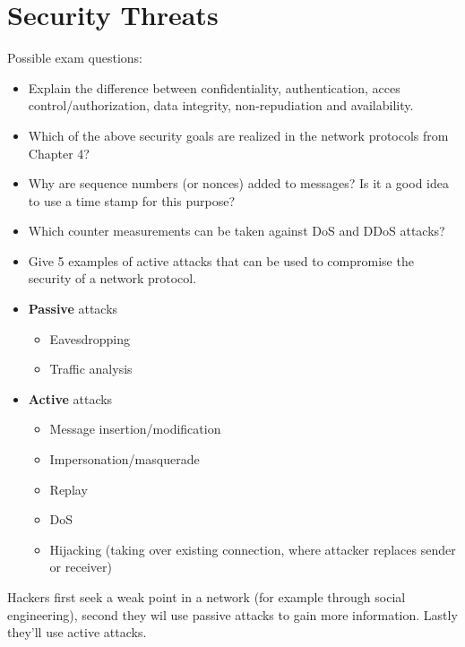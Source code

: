 \documentclass[11pt,british,faculty=ea,layout=titlefont,underline=false,titleUppercase=true,titleUnderline=true,hidelinks]{ugent2016-report}
\begin{document}
	\section{Security Threats} \label{sec:security-threats}
		Possible exam questions:
		\begin{itemize} \bfseries
			\item Explain the difference between confidentiality, authentication, acces control/authorization, data integrity, non-repudiation and availability.
			\item Which of the above security goals are realized in the network protocols from Chapter 4?
			\item Why are sequence numbers (or nonces) added to messages? Is it a good idea to use a time stamp for this purpose?
			\item Which counter measurements can be taken against DoS and DDoS attacks?
			\item Give 5 examples of active attacks that can be used to compromise the security of a network protocol.
		\end{itemize}
		\begin{itemize}
			\item \textbf{Passive} attacks
				\begin{itemize}
					\item Eavesdropping
					\item Traffic analysis
				\end{itemize}
			\item \textbf{Active} attacks
				\begin{itemize}
					\item Message insertion/modification
					\item Impersonation/masquerade
					\item Replay
					\item DoS
					\item Hijacking (taking over existing connection, where attacker replaces sender or receiver)
				\end{itemize}
		\end{itemize}
		Hackers first seek a weak point in a network (for example through social engineering), second they wil use passive attacks to gain more information. Lastly they'll use active attacks.
\end{document}
